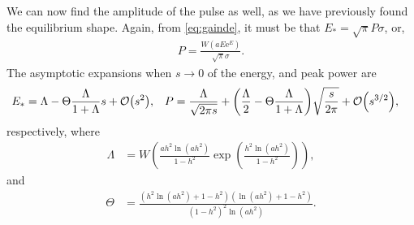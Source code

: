 We can now find the amplitude of the pulse as well, as we have previously found the equilibrium shape. Again, from \eqref{eq:gainde}, it must be that $E_* = \sqrt{\pi} P \sigma$, or,
\begin{align}
P = \frac{W(a E \textrm{e}^E)}{\sqrt{\pi} \sigma}.
\end{align}
The asymptotic expansions when $s \rightarrow 0$ of the energy, and peak power are
\begin{align*}
E_* &= \Lambda - \Theta \frac{\Lambda}{1 + \Lambda} s + \bigO{s^2}, & P &= \frac{\Lambda}{\sqrt{2 \pi s}} + \left( \frac{\Lambda}{2} -  \Theta \frac{\Lambda}{1 + \Lambda} \right) \sqrt{\frac{s}{2 \pi}} +  \bigO{s^{3/2}},
\end{align*}
respectively, where
\begin{align*}
\Lambda &= W\left( \frac{a h^2 \ln(a h^2)}{1 - h^2} \exp \left( \frac{h^2 \ln(a h^2)}{1 - h^2} \right) \right),
\end{align*}
and
\begin{align*}
\Theta &= \frac{\left( h^2 \ln(a h^2) + 1 - h^2 \right) \left( \ln(a h^2) + 1 - h^2 \right)}{\left( 1 - h^2 \right)^2 \ln(a h^2)}.
\end{align*}



